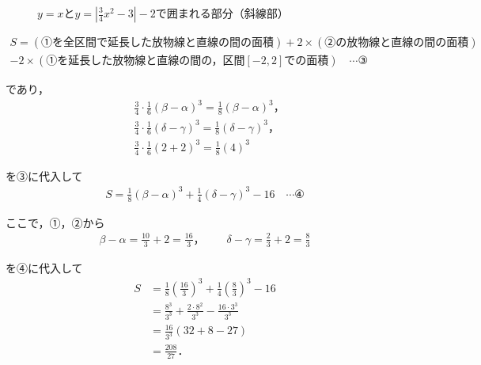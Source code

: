 \documentclass[../main.tex]{subfiles}
\begin{document}
\begin{figure}[htb]
  \centering
  \caption{$y=x$と$y=\left|\frac34x^2-3\right|-2$で囲まれる部分（斜線部）}
\end{figure}

\begin{align*}
  S=(\text{①を全区間で延長した放物線と直線の間の面積})+2\times(\text{②の放物線と直線の間の面積})\\
  -2\times(\text{①を延長した放物線と直線の間の，区間}[-2,2]\text{での面積})\quad\cdots③
\end{align*}

であり，
\begin{align*}
  &\frac34\cdot\frac16(\beta-\alpha)^3=\frac18(\beta-\alpha)^3，\\
  &\frac34\cdot\frac16(\delta-\gamma)^3=\frac18(\delta-\gamma)^3，\\
  &\frac34\cdot\frac16(2+2)^3=\frac18(4)^3
\end{align*}

を③に代入して
\begin{align*}
  S=\frac18(\beta-\alpha)^3+\frac14(\delta-\gamma)^3-16\quad\cdots④
\end{align*}

ここで，①，②から
\begin{align*}
  \beta-\alpha=\frac{10}3+2=\frac{16}3，\qquad\delta-\gamma=\frac23+2=\frac83
\end{align*}

を④に代入して
\begin{align*}
  S&=\frac18\left(\frac{16}3\right)^3+\frac14\left(\frac83\right)^3-16\\
  &=\frac{8^3}{3^3}+\frac{2\cdot8^2}{3^3}-\frac{16\cdot3^3}{3^3}\\
  &=\frac{16}{3^3}(32+8-27)\\
  &=\frac{208}{27}．
\end{align*}
\end{document}
